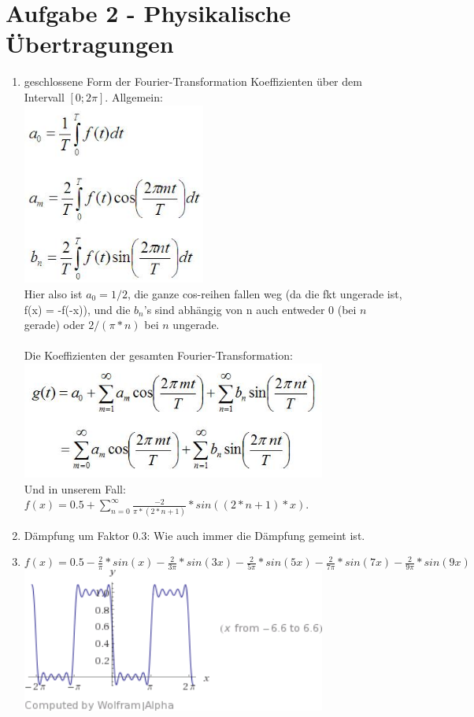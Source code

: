 \documentclass{scrartcl}
\begin{document}
\section*{Aufgabe 2 - Physikalische Übertragungen}
\begin{enumerate}
    \item geschlossene Form der Fourier-Transformation Koeffizienten über dem Intervall $[0;2\pi]$.
        Allgemein: \\
    \includegraphics[width=6cm]{optimalcoefficients.jpg} \\
        Hier also ist $a_0 = 1/2$, die ganze cos-reihen fallen weg (da die fkt ungerade ist, f(x) = -f(-x)),
        und die $b_n$'s sind abhängig von n auch entweder $0$ (bei $n$ gerade) oder $2/(\pi * n)$ bei $n$ ungerade. \\ \\
        Die Koeffizienten der gesamten Fourier-Transformation: \\
        \includegraphics[width=10cm]{fouriersum.jpg} \\
        Und in unserem Fall: $ f(x) = 0.5 + \sum_{n=0}^{\infty}{\frac{-2}{\pi * (2 * n + 1)} * sin((2 * n + 1) * x)} $.
    \item Dämpfung um Faktor 0.3: Wie auch immer die Dämpfung gemeint ist.
    \item $f(x) = 0.5 - \frac{2}{\pi}*sin(x) - \frac{2}{3\pi}*sin(3 x) - \frac{2}{5\pi}*sin(5 x) -
        \frac{2}{7\pi}*sin(7 x) - \frac{2}{9\pi}*sin(9 x) $ \\
        \includegraphics[width=10cm]{graph.png} \\


\end{enumerate}
\end{document}
